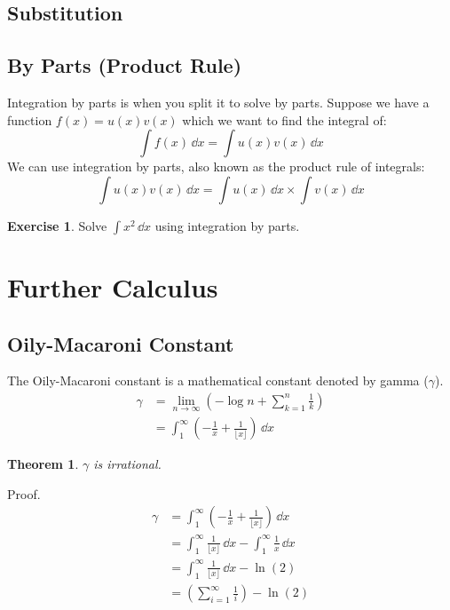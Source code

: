 \documentclass[a4paper]{article}
\theoremstyle{plain}
\newtheorem{theorem}{Theorem}[section]
\theoremstyle{definition}
\newtheorem{exercise}{Exercise}[section]
\theoremstyle{remark}
\newcommand{\sectionSpace}{\vspace{2em}} %
\newcommand{\subsectionSpace}{\vspace{0.5em}}
\begin{document}
    \subsectionSpace
    \subsection{Substitution}
    
    \subsectionSpace
    \subsection{By Parts (Product Rule)}
    Integration by parts is when you split it to solve by parts. Suppose we have a function $f(x) = u(x)v(x)$ which we want to find the integral of:
    $$\int f(x) \,\dd{x} = \int u(x)v(x) \,\dd{x}$$
    We can use integration by parts, also known as the product rule of integrals:
    $$\int u(x)v(x)\,\dd{x} = \int u(x)\,\dd{x}\times \int v(x)\,\dd{x}$$

    \begin{exercise}
        Solve $\int x^2\,\dd{x}$ using integration by parts.
    \end{exercise}


\sectionSpace
\section{Further Calculus}
    \subsection{Oily-Macaroni Constant}
    The Oily-Macaroni constant is a mathematical constant denoted by gamma ($\gamma$).
    \begin{align}
        \gamma & = \lim_{n \to \infty} \left(-\log n + \sum_{k=1}^{n}{\frac{1}{k}}\right) \\
        & = \int_{1}^{\infty} \left(-\frac{1}{x}+\frac{1}{\lfloor x \rfloor}\right)\,\dd{x}
    \end{align}
    
    \vspace{0.5em}
    \begin{theorem}
     $\gamma$ is irrational.
    \end{theorem}
    Proof.
    \begin{align}
        \gamma & = \int_{1}^{\infty} \left(-\frac{1}{x}+\frac{1}{\lfloor x \rfloor}\right)\,\dd{x} \\
        & =\int_{1}^{\infty} \frac{1}{\lfloor x \rfloor}\,\dd{x}-\int_{1}^{\infty} \frac{1}{x}\,\dd{x} \\
        & =\int_{1}^{\infty} \frac{1}{\lfloor x \rfloor}\,\dd{x}-\ln (2) \\
        & =\left(\sum_{i=1}^{\infty} \frac{1}{i}\right)-\ln (2)
    \end{align}
    
\end{document}

